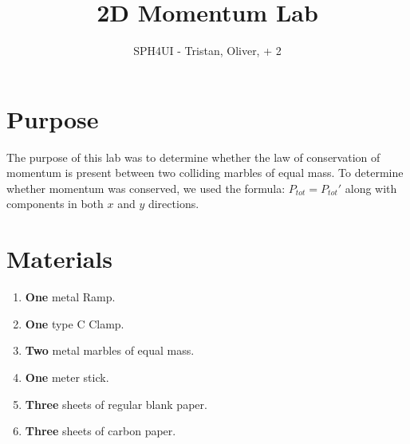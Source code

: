 \documentclass{article}
\title{2D Momentum Lab}
\author{SPH4UI - Tristan, Oliver, + 2}
\begin{document}
\maketitle

\section*{Purpose}
The purpose of this lab was to determine whether the law of conservation of momentum is present between two colliding marbles of equal mass.
To determine whether momentum was conserved, we used the formula: $P_{tot} = P_{tot}\prime$ along with components in both $x$ and $y$ directions.


\section*{Materials}
\begin{enumerate}
    \item {\textbf{One} metal Ramp.}
    \item {\textbf{One} type C Clamp.}
    \item {\textbf{Two} metal marbles of equal mass.}
    \item {\textbf{One} meter stick.}
    \item {\textbf{Three} sheets of regular blank paper.}
    \item {\textbf{Three} sheets of carbon paper.}
\end{enumerate}


\end{document}

